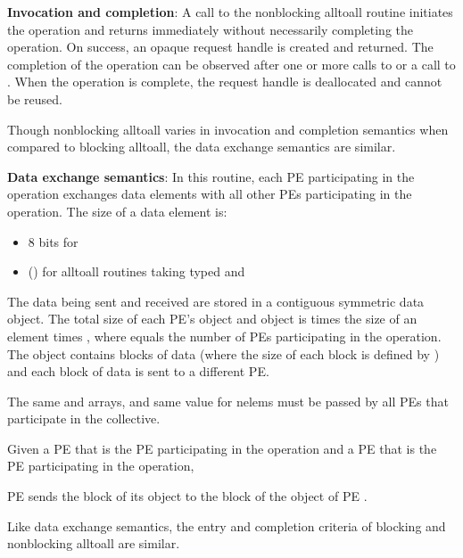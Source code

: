 \begin{apidefinition}
{    {\bf Invocation and completion}: A call to the nonblocking alltoall routine initiates the operation and returns
    immediately without necessarily completing the operation. On success,
    an opaque request handle is created and returned. The completion of the
    operation can be observed after one or more calls to  or a
    call to . When the operation is complete, the request handle
    is deallocated and cannot be reused.

    Though nonblocking alltoall varies in invocation and completion semantics
    when compared to blocking alltoall, the data exchange semantics are similar.

    {\bf Data exchange semantics}:
    In this routine, each \ac{PE}
    participating in the operation exchanges  data elements
    with all other \acp{PE} participating in the operation.
    The size of a data element is:
    \begin{itemize}
    \item 8 bits for 
    \item {}(\TYPE{}) for alltoall routines taking typed  and 
    \end{itemize}

    The data being sent and received are
    stored in a contiguous symmetric data object. The total size of each \ac{PE}'s
     object and  object is  times the size of
    an element
    times , where  equals the number of \acp{PE} participating
    in the operation.
    The  object contains  blocks of data
    (where the size of each block is defined by ) and each block of data
    is sent to a different \ac{PE}.

    The same \dest{} and \source{}
    arrays, and same value for nelems
    must be passed by all \acp{PE} that participate in the collective.

    Given a \ac{PE}  that is the \kth \ac{PE}
    participating in the operation and a \ac{PE}
     that is the \lth \ac{PE}
    participating in the operation,

    \ac{PE}  sends the \lth block of its  object to
    the \kth block of
    the  object of \ac{PE} .

    Like data exchange semantics, the entry and completion
    criteria of blocking and nonblocking alltoall are similar.

}
\end{apidefinition}
